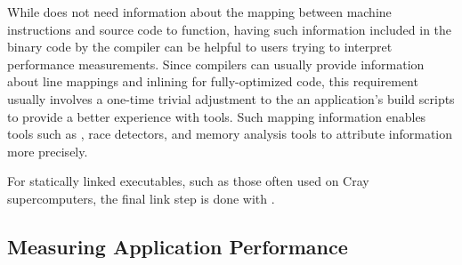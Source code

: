 \documentclass[11pt,twoside,letterpaper]{report}
\begin{document}
While \HPCToolkit{} does not need information about the mapping between machine instructions and source code to function,
having such information included in the binary code by the compiler can be helpful to users trying to interpret performance measurements.
Since compilers can usually provide information about line mappings and inlining for fully-optimized code,
this requirement usually involves a one-time trivial adjustment to the an application's build scripts
to provide a better experience with tools. Such mapping information enables tools such as \HPCToolkit{},
race detectors, and memory analysis tools to attribute information more precisely.

For statically linked executables, such as those often used on  Cray supercomputers, the final link step is done with \hpclink{}.


\subsection{Measuring Application Performance}
\label{chpt:quickstart:tour:measurement}
\end{document}
